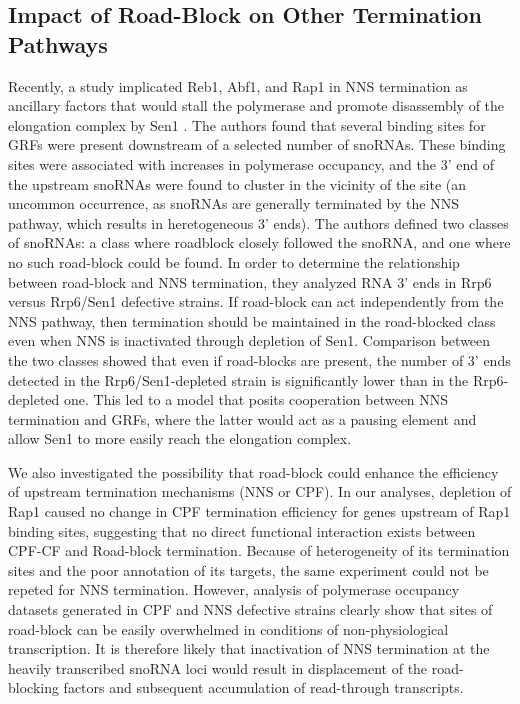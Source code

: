 \subsection{Impact of Road-Block on Other Termination Pathways}

Recently, a study implicated Reb1, Abf1, and Rap1 in NNS termination as ancillary factors that would stall the polymerase and promote disassembly of the elongation complex by Sen1 \cite{roy:2016:common}.
The authors found that several binding sites for GRFs were present downstream of a selected number of snoRNAs. 
These binding sites were associated with increases in polymerase occupancy, and the 3’ end of the upstream snoRNAs were found to cluster in the vicinity of the site (an uncommon occurrence, as snoRNAs are generally terminated by the NNS pathway, which results in heretogeneous 3’ ends). 
The authors defined two classes of snoRNAs: a class where roadblock closely followed the snoRNA, and one where no such road-block could be found.
In order to determine the relationship between road-block and NNS termination, they analyzed RNA 3' ends in Rrp6 versus Rrp6/Sen1 defective strains.
If road-block can act independently from the NNS pathway, then termination should be maintained in the road-blocked class even when NNS is inactivated through depletion of Sen1.
Comparison between the two classes showed that even if road-blocks are present, the number of 3' ends detected in the Rrp6/Sen1-depleted strain is significantly lower than in the Rrp6-depleted one.
This led to a model that posits cooperation between NNS termination and GRFs, where the latter would act as a pausing element and allow Sen1 to more easily reach the elongation complex.

We also investigated the possibility that road-block could enhance the efficiency of upstream termination mechanisms (NNS or CPF). 
In our analyses, depletion of Rap1 caused no change in CPF termination efficiency for genes upstream of Rap1 binding sites, suggesting that no direct functional interaction exists between CPF-CF and Road-block termination. 
Because of heterogeneity of its termination sites and the poor annotation of its targets, the same experiment could not be repeted for NNS termination.
However, analysis of polymerase occupancy datasets generated in CPF and NNS defective strains clearly show that sites of road-block can be easily overwhelmed in conditions of non-physiological transcription.
It is therefore likely that inactivation of NNS termination at the heavily transcribed snoRNA loci would result in displacement of the road-blocking factors and subsequent accumulation of read-through transcripts. 


